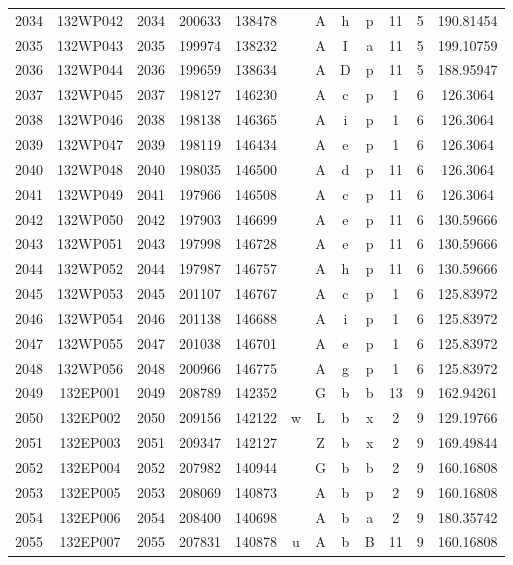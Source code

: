 \begin{tabular}{|*{12}{c|}}
2034 & 132WP042 & 2034 & 200633 & 138478 &  & A & h & p & 11 & 5 & 190.81454 \\ 
2035 & 132WP043 & 2035 & 199974 & 138232 &  & A & I & a & 11 & 5 & 199.10759 \\ 
2036 & 132WP044 & 2036 & 199659 & 138634 &  & A & D & p & 11 & 5 & 188.95947 \\ 
2037 & 132WP045 & 2037 & 198127 & 146230 &  & A & c & p & 1 & 6 & 126.3064 \\ 
2038 & 132WP046 & 2038 & 198138 & 146365 &  & A & i & p & 1 & 6 & 126.3064 \\ 
2039 & 132WP047 & 2039 & 198119 & 146434 &  & A & e & p & 1 & 6 & 126.3064 \\ 
2040 & 132WP048 & 2040 & 198035 & 146500 &  & A & d & p & 11 & 6 & 126.3064 \\ 
2041 & 132WP049 & 2041 & 197966 & 146508 &  & A & c & p & 11 & 6 & 126.3064 \\ 
2042 & 132WP050 & 2042 & 197903 & 146699 &  & A & e & p & 11 & 6 & 130.59666 \\ 
2043 & 132WP051 & 2043 & 197998 & 146728 &  & A & e & p & 11 & 6 & 130.59666 \\ 
2044 & 132WP052 & 2044 & 197987 & 146757 &  & A & h & p & 11 & 6 & 130.59666 \\ 
2045 & 132WP053 & 2045 & 201107 & 146767 &  & A & c & p & 1 & 6 & 125.83972 \\ 
2046 & 132WP054 & 2046 & 201138 & 146688 &  & A & i & p & 1 & 6 & 125.83972 \\ 
2047 & 132WP055 & 2047 & 201038 & 146701 &  & A & e & p & 1 & 6 & 125.83972 \\ 
2048 & 132WP056 & 2048 & 200966 & 146775 &  & A & g & p & 1 & 6 & 125.83972 \\ 
2049 & 132EP001 & 2049 & 208789 & 142352 &  & G & b & b & 13 & 9 & 162.94261 \\ 
2050 & 132EP002 & 2050 & 209156 & 142122 & w & L & b & x & 2 & 9 & 129.19766 \\ 
2051 & 132EP003 & 2051 & 209347 & 142127 &  & Z & b & x & 2 & 9 & 169.49844 \\ 
2052 & 132EP004 & 2052 & 207982 & 140944 &  & G & b & b & 2 & 9 & 160.16808 \\ 
2053 & 132EP005 & 2053 & 208069 & 140873 &  & A & b & p & 2 & 9 & 160.16808 \\ 
2054 & 132EP006 & 2054 & 208400 & 140698 &  & A & b & a & 2 & 9 & 180.35742 \\ 
2055 & 132EP007 & 2055 & 207831 & 140878 & u & A & b & B & 11 & 9 & 160.16808 \\ 

\end{tabular}
